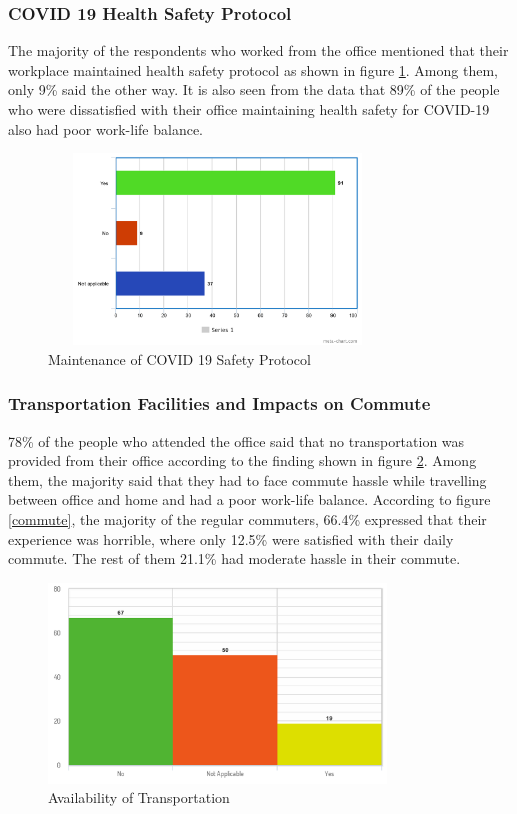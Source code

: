 \documentclass[11pt]{article}
\begin{document}
\subsubsection{COVID 19 Health Safety Protocol}
The majority of the respondents who worked from the office mentioned that their workplace maintained health safety protocol as shown in figure \ref{health}. Among them, only 9\% said the other way. It is also seen from the data that 89\% of the people who were dissatisfied with their office maintaining health safety for COVID-19 also had poor work-life balance.

\begin{figure}[!ht]
	\centering
	\includegraphics[width=0.8\textwidth, height=2in]{Images/Experience/Health Safety.png}
	\caption{Maintenance of COVID 19 Safety Protocol}
	\centering
	\label{health}
\end{figure}


\subsubsection{Transportation Facilities and Impacts on Commute}
78\% of the people who attended the office said that no transportation was provided from their office according to the finding shown in figure \ref{transport}. Among them, the majority said that they had to face commute hassle while travelling between office and home and had a poor work-life balance. According to figure \ref{commute}, the majority of the regular commuters, 66.4\% expressed that their experience was horrible, where only 12.5\% were satisfied with their daily commute. The rest of them 21.1\% had moderate hassle in their commute. 

\begin{figure}[!ht]
	\centering
	\includegraphics[width=0.8\textwidth]{Images/Experience/Transportation.png}
	\caption{Availability of Transportation}
	\centering
	\label{transport}
\end{figure}
\end{document}
